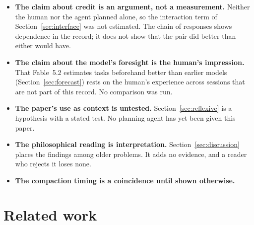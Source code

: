 \documentclass[11pt,a4paper]{article}
\begin{document}
\begin{itemize}
\item \textbf{The claim about credit is an argument, not a measurement.} Neither the human nor the agent planned alone, so the interaction term of Section~\ref{sec:interface} was not estimated. The chain of responses shows dependence in the record; it does not show that the pair did better than either would have.
\item \textbf{The claim about the model's foresight is the human's impression.} That Fable~5.2 estimates tasks beforehand better than earlier models (Section~\ref{sec:forecast}) rests on the human's experience across sessions that are not part of this record. No comparison was run.
\item \textbf{The paper's use as context is untested.} Section~\ref{sec:reflexive} is a hypothesis with a stated test. No planning agent has yet been given this paper.
\item \textbf{The philosophical reading is interpretation.} Section~\ref{sec:discussion} places the findings among older problems. It adds no evidence, and a reader who rejects it loses none.
\item \textbf{The compaction timing is a coincidence until shown otherwise.}
\end{itemize}

\section{Related work}
\end{document}
